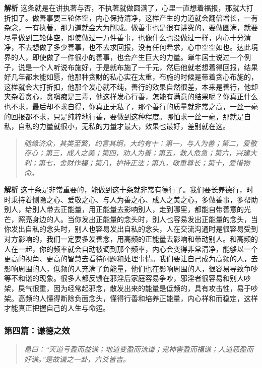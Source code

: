 \textbf{解析} 这条就是在讲执著与否，不执著就做圆满了，心里一直想着福报，那就大打折扣了。做善事要三轮体空，内心保持清净，这样产生的力道就会翻倍增长，一有杂念，一有执著，那力道就会大为削减。做善事也是很有讲究的，要做圆满，就要尽量做到三轮体空，即使做过一万件善事，也像什么也没做过一样，内心十分清净，不去想做了多少善事，也不去求回报，没有任何希求，心中空空如也。达此境界的人，即使做了一件很小的善事，也会产生巨大的力量。犟牛居士说过一个例子，说是一个人听说布施好，于是就布施了一千元，然后他就老想着得回报，结果好几年都未能如愿，他那种贪财的私心实在太重，布施的时候是带着贪心布施的，这样就会大打折扣，他那个发心就不纯，善行的效果自然很差，本来是善行，他却夹杂着贪心，贪嗔痴是三毒，他这样发心行善，怎能有满意的结果呢？你真正什么也不求，最后却不求自得，你真正无私了，那个善行的质量就非常之高，一丝一毫的回报都不求，只是纯粹地行善，要做到这种程度。哪怕求一丝一毫，那就是自私，自私的力量就很小，无私的力量才最大，效果也最好，差别就在这。

\begin{quote}\it
    随缘济众，其类至繁，约言其纲，大约有十：第一，与人为善；第二，爱敬存心；第三，成人之美；第四，劝人为善；第五，救人危急；第六，兴建大利；第七，舍财作福；第八，护持正法；第九，敬重尊长；第十，爱惜物命。
\end{quote}

\textbf{解析} 这十条是非常重要的，能做到这十条就非常有德行了。我们要长养德行，时时秉持着恻隐之心、爱敬之心、与人为善之心、成人之美之心，多做善事，多帮助别人，给别人带去正能量，用正能量去影响别人，走到哪里，都能自带善意的光芒，照亮身边的人。当你发出正能量的念头时，别人也容易发出正能量的念头，当你发出自私的念头时，别人也容易发出自私的念头，人在交流沟通时是很容易受到对方影响的，我们一定要多发善念，用高频的正能量去影响和带动别人。和高频的人在一起，你的频率就会自动被调到那个频率，内心会变得非常清净，能够以一个更高的视角、更高的智慧去看待问题和处理事情。我们要让自己成为高频的人，去影响周围的人，低频的人充满了负能量，他们也在影响周围的人，很容易导致争吵等不和谐的现象。很多人都反馈在邪淫后家庭容易争吵，邪淫者很容易和别人吵架，戾气很重，因为经常起邪念，散发出来的能量是低频的，具有攻击性，易于吵架。高频的人懂得断除负面念头，懂得行善和培养正能量，内心祥和而稳定，这样才能真正把握自己的人生与命运。

\subsubsection{第四篇：谦德之效}

\begin{quote}\it
    易曰：“天道亏盈而益谦；地道变盈而流谦；鬼神害盈而福谦；人道恶盈而好谦。”是故谦之一卦，六爻皆吉。
\end{quote}

